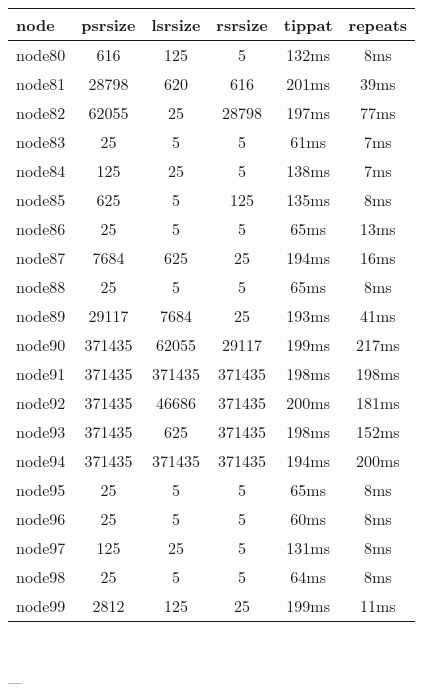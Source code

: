 \begin{tabular}{|l|c|c|c|c|c|}
\hline node & psrsize & lsrsize & rsrsize   & tippat & repeats\\
    \hline node80 & 616 & 125 & 5 & 132ms & 8ms\\
    \hline node81 & 28798 & 620 & 616 & 201ms & 39ms\\
    \hline node82 & 62055 & 25 & 28798 & 197ms & 77ms\\
    \hline node83 & 25 & 5 & 5 & 61ms & 7ms\\
    \hline node84 & 125 & 25 & 5 & 138ms & 7ms\\
    \hline node85 & 625 & 5 & 125 & 135ms & 8ms\\
    \hline node86 & 25 & 5 & 5 & 65ms & 13ms\\
    \hline node87 & 7684 & 625 & 25 & 194ms & 16ms\\
    \hline node88 & 25 & 5 & 5 & 65ms & 8ms\\
    \hline node89 & 29117 & 7684 & 25 & 193ms & 41ms\\
    \hline node90 & 371435 & 62055 & 29117 & 199ms & 217ms\\
    \hline node91 & 371435 & 371435 & 371435 & 198ms & 198ms\\
    \hline node92 & 371435 & 46686 & 371435 & 200ms & 181ms\\
    \hline node93 & 371435 & 625 & 371435 & 198ms & 152ms\\
    \hline node94 & 371435 & 371435 & 371435 & 194ms & 200ms\\
    \hline node95 & 25 & 5 & 5 & 65ms & 8ms\\
    \hline node96 & 25 & 5 & 5 & 60ms & 8ms\\
    \hline node97 & 125 & 25 & 5 & 131ms & 8ms\\
    \hline node98 & 25 & 5 & 5 & 64ms & 8ms\\
    \hline node99 & 2812 & 125 & 25 & 199ms & 11ms\\

\hline
\end{tabular} \

---


